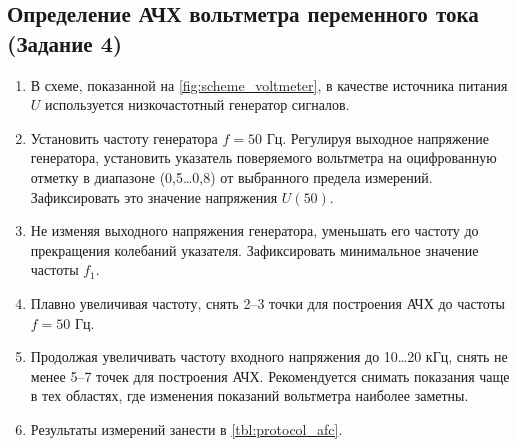 \subsection*{Определение АЧХ вольтметра переменного тока (Задание 4)}
\begin{enumerate}
    \item В схеме, показанной на \cref{fig:scheme_voltmeter}, в качестве источника питания $U$ используется низкочастотный генератор сигналов.
    \item Установить частоту генератора $f = 50$ Гц. Регулируя выходное напряжение генератора, установить указатель поверяемого вольтметра на оцифрованную отметку в диапазоне (0,5\dots0,8) от выбранного предела измерений. Зафиксировать это значение напряжения $U(50)$.
    \item Не изменяя выходного напряжения генератора, уменьшать его частоту до прекращения колебаний указателя. Зафиксировать минимальное значение частоты $f_1$.
    \item Плавно увеличивая частоту, снять 2--3 точки для построения АЧХ до частоты $f = 50$ Гц.
    \item Продолжая увеличивать частоту входного напряжения до 10\dots20 кГц, снять не менее 5--7 точек для построения АЧХ. Рекомендуется снимать показания чаще в тех областях, где изменения показаний вольтметра наиболее заметны.
    \item Результаты измерений занести в \cref{tbl:protocol_afc}.
\end{enumerate}